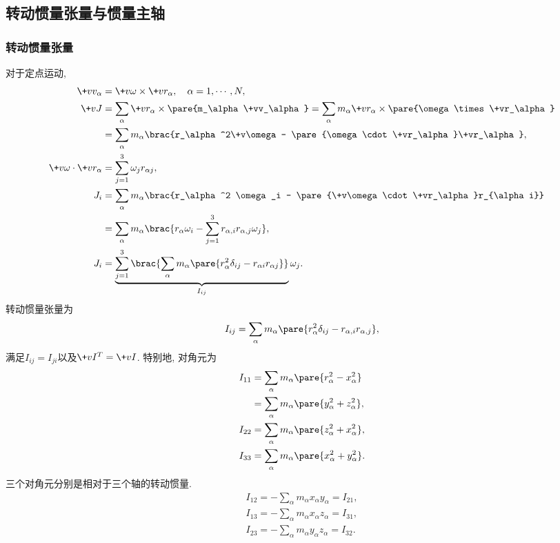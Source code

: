 \documentclass[../LectureNotes.tex]{subfiles}
\begin{document}


\subsection{转动惯量张量与惯量主轴} %
\label{sub:转动惯量张量与惯量主轴}

\subsubsection{转动惯量张量} %
\label{ssub:转动惯量张量}

对于定点运动,
\begin{align*}
    \+vv_\alpha &= \+v\omega\times\+vr_\alpha,\quad \alpha = 1,\cdots,N, \\
    \+vJ &= \sum_\alpha \+vr_\alpha\times\pare{m_\alpha\+vv_\alpha} = \sum_\alpha m_\alpha\+vr_\alpha\times\pare{\omega\times\+vr_\alpha} \\
    &= \sum_\alpha m_\alpha\brac{r_\alpha^2\+v\omega - \pare{\omega\cdot\+vr_\alpha}\+vr_\alpha}, \\
    \+v\omega\cdot\+vr_\alpha &= \sum_{j=1}^3 \omega_j r_{\alpha j}, \\
    J_i &= \sum_\alpha m_\alpha\brac{r_\alpha^2 \omega_i - \pare{\+v\omega \cdot\+vr_\alpha}r_{\alpha i}} \\
    &= \sum_\alpha m_\alpha\brac{r_\alpha\omega_i - \sum_{j=1}^3 r_{\alpha,i}r_{\alpha,j}\omega_j}, \\
    J_i &= \underbrace{\sum_{j=1}^3 \brac{\sum_\alpha m_\alpha \pare{r_\alpha^2 \delta_{ij} - r_{\alpha i}r_{\alpha j}}}}_{I_{ij}} \omega_j.
\end{align*}
转动惯量张量为
\[ I_{ij} = \sum_\alpha m_\alpha\pare{r_\alpha^2\delta_{ij} - r_{\alpha,i}r_{\alpha,j}}, \]
满足$I_{ij} = I_{ji}$以及$\+vI^T = \+vI$. 特别地, 对角元为
\begin{align*}
    I_{11} &= \sum_\alpha m_\alpha\pare{r_\alpha^2 - x_\alpha^2} \\
    &= \sum_\alpha m_\alpha\pare{y_\alpha^2 + z_\alpha^2}, \\
    I_{22} &= \sum_\alpha m_\alpha\pare{z_\alpha^2 + x_\alpha^2}, \\
    I_{33} &= \sum_\alpha m_\alpha\pare{x_\alpha^2 + y_\alpha^2}.
\end{align*}
三个对角元分别是相对于三个轴的转动惯量.
\begin{align*}
    I_{12} = -\sum_\alpha m_\alpha x_\alpha y_\alpha = I_{21}, \\
    I_{13} = -\sum_\alpha m_\alpha x_\alpha z_\alpha = I_{31}, \\
    I_{23} = -\sum_\alpha m_\alpha y_\alpha z_\alpha = I_{32}.
\end{align*}
\end{document}

